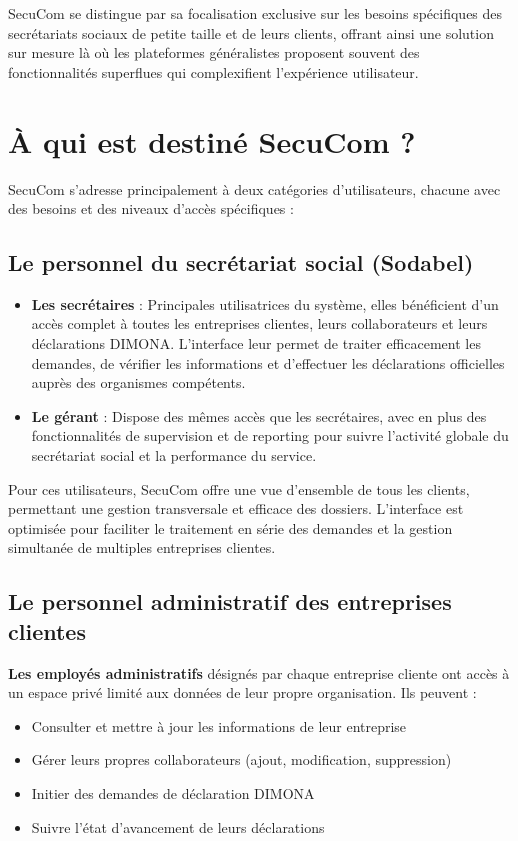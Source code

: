 SecuCom se distingue par sa focalisation exclusive sur les besoins spécifiques des secrétariats sociaux de petite taille et de leurs clients, offrant ainsi une solution sur mesure là où les plateformes généralistes proposent souvent des fonctionnalités superflues qui complexifient l'expérience utilisateur.

\section{À qui est destiné SecuCom ?}

SecuCom s'adresse principalement à deux catégories d'utilisateurs, chacune avec des besoins et des niveaux d'accès spécifiques :

\subsection{Le personnel du secrétariat social (Sodabel)}

\begin{itemize}
  \item \textbf{Les secrétaires} : Principales utilisatrices du système, elles bénéficient d'un accès complet à toutes les entreprises clientes, leurs collaborateurs et leurs déclarations DIMONA. L'interface leur permet de traiter efficacement les demandes, de vérifier les informations et d'effectuer les déclarations officielles auprès des organismes compétents.

  \item \textbf{Le gérant} : Dispose des mêmes accès que les secrétaires, avec en plus des fonctionnalités de supervision et de reporting pour suivre l'activité globale du secrétariat social et la performance du service.
\end{itemize}

Pour ces utilisateurs, SecuCom offre une vue d'ensemble de tous les clients, permettant une gestion transversale et efficace des dossiers. L'interface est optimisée pour faciliter le traitement en série des demandes et la gestion simultanée de multiples entreprises clientes.

\subsection{Le personnel administratif des entreprises clientes}

\textbf{Les employés administratifs} désignés par chaque entreprise cliente ont accès à un espace privé limité aux données de leur propre organisation. Ils peuvent :
\begin{itemize}
  \item Consulter et mettre à jour les informations de leur entreprise
  \item Gérer leurs propres collaborateurs (ajout, modification, suppression)
  \item Initier des demandes de déclaration DIMONA
  \item Suivre l'état d'avancement de leurs déclarations
\end{itemize}


